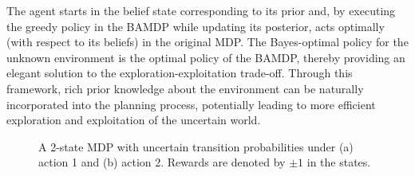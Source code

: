 The agent starts in the belief state corresponding to its prior and, by executing the greedy policy in the BAMDP while updating its posterior, acts optimally (with respect to its beliefs) in the original MDP. The Bayes-optimal policy for the unknown environment is the optimal policy of the BAMDP, thereby providing an elegant solution to the exploration-exploitation trade-off. 
Through this framework, rich prior knowledge about the environment can be naturally incorporated into the planning process, potentially leading to more efficient exploration and exploitation of the uncertain world. 
\begin{figure}
    \centering
    \begin{floatrow}
    \end{floatrow}
   \caption{A 2-state MDP with uncertain transition probabilities under (a) action 1 and (b) action 2. Rewards are denoted by $\pm 1$ in the states.}
   \label{fig:duff-2-state-mdp}
\end{figure}

